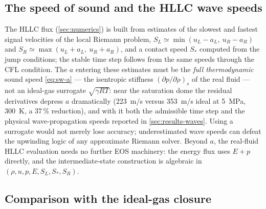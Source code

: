 \documentclass[11pt]{article}
\begin{document}
\subsection{The speed of sound and the HLLC wave speeds}
\label{app:sound}

The HLLC flux (\cref{sec:numerics}) is built from estimates of the
slowest and fastest signal velocities of the local Riemann problem,
$S_L \simeq \min(u_L - a_L,\ u_R - a_R)$ and
$S_R \simeq \max(u_L + a_L,\ u_R + a_R)$, and a contact speed $S_*$
computed from the jump conditions; the stable time step follows from
the same speeds through the CFL condition. The $a$ entering these
estimates must be the \emph{full thermodynamic} sound speed
\eqref{eq:sw-a} --- the isentropic stiffness
$(\partial p/\partial\rho)_s$ of the real fluid --- not an ideal-gas
surrogate $\sqrt{\gamma R T}$: near the saturation dome the residual
derivatives depress $a$ dramatically (\SI{223}{m/s} versus
\SI{353}{m/s} ideal at \SI{5}{MPa}, \SI{300}{K}, a 37\,\%
reduction), and with it both the admissible time step and the physical
wave-propagation speeds reported in \cref{sec:results-waves}. Using a
surrogate would not merely lose accuracy; underestimated wave speeds
can defeat the upwinding logic of any approximate Riemann solver.
Beyond $a$, the real-fluid HLLC evaluation needs no further EOS
machinery: the energy flux uses $E + p$ directly, and the
intermediate-state construction is algebraic in
$(\rho, u, p, E, S_L, S_*, S_R)$.

\subsection{Comparison with the ideal-gas closure}
\label{app:ideal}
\end{document}
